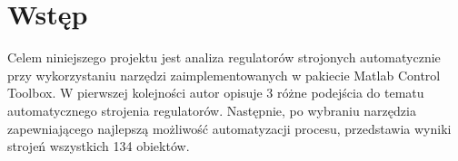 \chapter*{Wstęp}

Celem niniejszego projektu jest analiza regulatorów strojonych automatycznie przy wykorzystaniu  narzędzi zaimplementowanych w pakiecie Matlab Control Toolbox. W pierwszej kolejności autor opisuje 3 różne podejścia do tematu automatycznego strojenia regulatorów. Następnie, po wybraniu narzędzia zapewniającego najlepszą możliwość automatyzacji procesu, przedstawia wyniki strojeń wszystkich 134 obiektów.